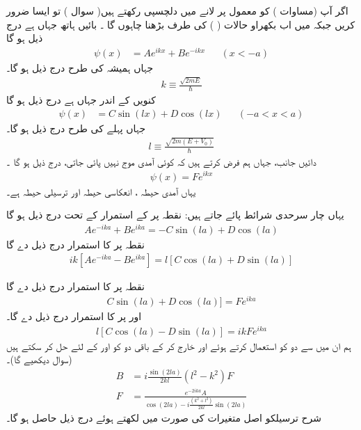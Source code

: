  اگر آپ  (مساوات ) کو معمول پر لانے میں دلچسپی رکھتے ہیں( سوال ) تو ایسا ضرور کریں جبکہ میں اب بکھراو حالات ( ) کی طرف بڑھنا چاہوں گا ۔ بائیں ہاتھ جہاں ہے درج ذیل ہو گا 
\begin{align}
\psi(x)&=Ae^{i k x}+Be^{-i k x} && (x<-a) 
\end{align}
 جہاں ہمیشہ کی طرح درج ذیل ہو گا۔
 \begin{align}
 k\equiv \frac{\sqrt{2mE}}{\hslash} 
 \end{align} 
 کنویں  کے اندر جہاں ہے درج ذیل ہو گا
\begin{align}
\psi(x)&=C\sin(lx)+D\cos(lx)&& (-a<x<a)
 \end{align}
 جہاں پہلے کی طرح درج ذیل ہو گا۔
 \begin{align}
 l\equiv \frac{\sqrt{2m(E+V_{0})}}{\hslash}
 \end{align}
  دائیں جانب، جہاں ہم فرض کرتے ہیں کہ کوئی آمدی موج نہیں پائی جاتی، درج ذیل ہو گا ۔
 \begin{align}
 \psi(x)=Fe^{i k x} 
 \end{align}
 یہاں آمدی حیطہ ، انعکاسی حیطہ  اور ترسیلی حیطہ  ہے۔ 
 
 یہاں چار سرحدی شرائط پائے جاتے ہیں: نقطہ  پر  کے استمرار کے تحت درج ذیل ہو گا
\begin{align}\label{مساوات_شروڈنگر_اے}
Ae^{-ika}+Be^{ika} = -C\sin(la)+D\cos(la)
 \end{align}
نقطہ پر کا استمرار درج ذیل دے گا
\begin{align}\label{مساوات_شروڈنگر_اے_بی}
ik[Ae^{-ika}-Be^{ika}] =l[C\cos(la)+D\sin(la)] 
\end{align}

نقطہ  پر کا استمرار درج ذیل دے گا 
\begin{align}\label{مساوات_شروڈنگر_سی}
C\sin (la)+D\cos(la)]=Fe^{ika} 
\end{align}
اور  پر کا استمرار درج ذیل دے گا۔
\begin{align}\label{مساوات_شروڈنگر_ڈی}
l[C\cos(la)-D\sin(la)]=ikFe^{ika} 
\end{align}
 ہم ان میں سے دو کو استعمال کرتے ہوئے  اور  خارج کر کے باقی دو کو  اور  کے لئے حل کر سکتے ہیں (سوال  دیکھیے گا)۔
\begin{align}
B&=i\frac{\sin(2la)}{2kl}(l^{2}-k^{2})F \label{مساوات_شروڈنگر_بی}\\
F&=\frac{e^{-2ika}A}{\cos(2la)-i\frac{(k^{2}+l^{2})}{2kl}\sin(2la)}\label{مساوات_شروڈنگر_ایف}
\end{align}
 شرح ترسیلکو اصل متغیرات کی صورت میں لکھتے ہوئے درج ذیل حاصل ہو گا۔

